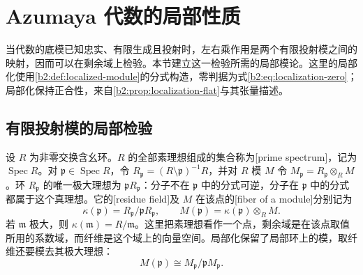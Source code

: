

\section{Azumaya 代数的局部性质}
\label{b2:sec:C02}

当代数的底模已知忠实、有限生成且投射时，左右乘作用是两个有限投射模之间的映射，因而可以在剩余域上检验。本节建立这一检验所需的局部模论。这里的局部化使用\cref{b2:def:localized-module}的分式构造，零判据为式\eqref{b2:eq:localization-zero}；局部化保持正合性，来自\cref{b2:prop:localization-flat}与其张量描述。

\subsection{有限投射模的局部检验}
\label{b2:subsec:C02:01}

设 \(R\) 为非零交换含幺环。\(R\) 的全部素理想组成的集合称为[prime spectrum]，记为 \(\operatorname{Spec}R\)。对 \(\mathfrak p\in\operatorname{Spec}R\)，令 \(R_{\mathfrak p}=(R\setminus\mathfrak p)^{-1}R\)，并对 \(R\) 模 \(M\) 令 \(M_{\mathfrak p}=R_{\mathfrak p}\otimes_R M\)。环 \(R_{\mathfrak p}\) 的唯一极大理想为 \(\mathfrak pR_{\mathfrak p}\)：分子不在 \(\mathfrak p\) 中的分式可逆，分子在 \(\mathfrak p\) 中的分式都属于这个真理想。它的[residue field]及 \(M\) 在该点的[fiber of a module]分别记为
\[
	\kappa(\mathfrak p)=R_{\mathfrak p}/\mathfrak pR_{\mathfrak p}, \qquad M(\mathfrak p)=\kappa(\mathfrak p)\otimes_R M.
\]
若 \(\mathfrak m\) 极大，则 \(\kappa(\mathfrak m)=R/\mathfrak m\)。这里把素理想看作一个点，剩余域是在该点取值所用的系数域，而纤维是这个域上的向量空间。局部化保留了局部环上的模，取纤维还要模去其极大理想：
\[
	M(\mathfrak p)\cong M_{\mathfrak p}/\mathfrak pM_{\mathfrak p}.
\]

